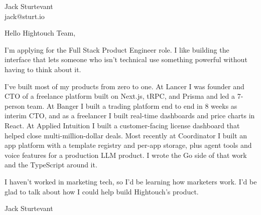 \documentclass[11pt]{article}
\begin{document}
\raggedright

{\namefont\fontsize{20pt}{24pt}\selectfont Jack Sturtevant}\\[-0.3em]
jack@sturt.io

\vspace{1.2em}

Hello Hightouch Team,

I'm applying for the Full Stack Product Engineer role. I like building the interface that lets someone who isn't technical use something powerful without having to think about it.

I've built most of my products from zero to one. At Lancer I was founder and CTO of a freelance platform built on Next.js, tRPC, and Prisma and led a 7-person team. At Banger I built a trading platform end to end in 8 weeks as interim CTO, and as a freelancer I built real-time dashboards and price charts in React. At Applied Intuition I built a customer-facing license dashboard that helped close multi-million-dollar deals. Most recently at Coordinator I built an app platform with a template registry and per-app storage, plus agent tools and voice features for a production LLM product. I wrote the Go side of that work and the TypeScript around it.

I haven't worked in marketing tech, so I'd be learning how marketers work. I'd be glad to talk about how I could help build Hightouch's product.

\vspace{0.6em}
Jack Sturtevant
\end{document}

